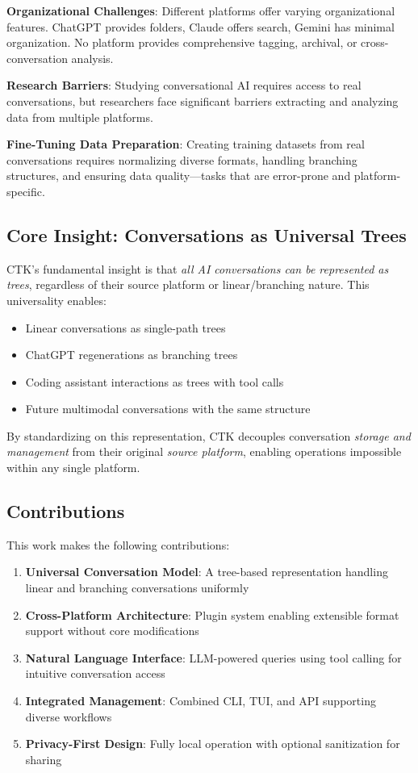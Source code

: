 \documentclass[11pt,letterpaper]{article}
\begin{document}
\textbf{Organizational Challenges}: Different platforms offer varying organizational features. ChatGPT provides folders, Claude offers search, Gemini has minimal organization. No platform provides comprehensive tagging, archival, or cross-conversation analysis.

\textbf{Research Barriers}: Studying conversational AI requires access to real conversations, but researchers face significant barriers extracting and analyzing data from multiple platforms.

\textbf{Fine-Tuning Data Preparation}: Creating training datasets from real conversations requires normalizing diverse formats, handling branching structures, and ensuring data quality---tasks that are error-prone and platform-specific.

\subsection{Core Insight: Conversations as Universal Trees}

CTK's fundamental insight is that \emph{all AI conversations can be represented as trees}, regardless of their source platform or linear/branching nature. This universality enables:

\begin{itemize}
    \item Linear conversations as single-path trees
    \item ChatGPT regenerations as branching trees
    \item Coding assistant interactions as trees with tool calls
    \item Future multimodal conversations with the same structure
\end{itemize}

By standardizing on this representation, CTK decouples conversation \emph{storage and management} from their original \emph{source platform}, enabling operations impossible within any single platform.

\subsection{Contributions}

This work makes the following contributions:

\begin{enumerate}
    \item \textbf{Universal Conversation Model}: A tree-based representation handling linear and branching conversations uniformly
    \item \textbf{Cross-Platform Architecture}: Plugin system enabling extensible format support without core modifications
    \item \textbf{Natural Language Interface}: LLM-powered queries using tool calling for intuitive conversation access
    \item \textbf{Integrated Management}: Combined CLI, TUI, and API supporting diverse workflows
    \item \textbf{Privacy-First Design}: Fully local operation with optional sanitization for sharing
\end{enumerate}
\end{document}
